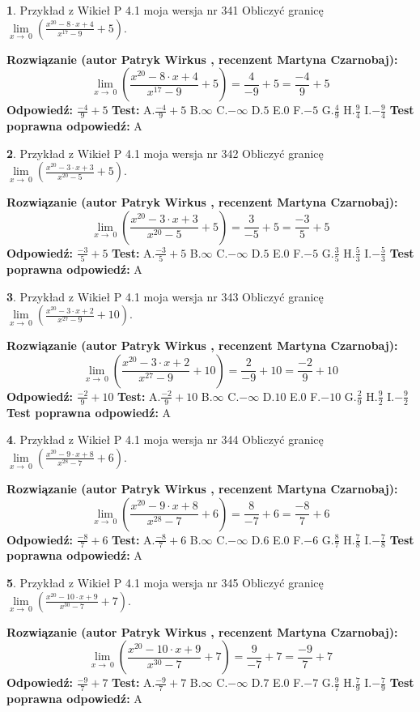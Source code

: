 \documentclass[12pt, a4paper]{article}
\theoremstyle{definition} %
\newtheorem{zad}{}
\newcommand{\zadStart}[1]{\begin{zad}#1\newline}
\newcommand{\zadStop}{\end{zad}}
\newcommand{\rozwStart}[2]{\noindent \textbf{Rozwiązanie (autor #1 , recenzent #2): }\newline}
\newcommand{\rozwStop}{\newline}
\newcommand{\odpStart}{\noindent \textbf{Odpowiedź:}\newline}
\newcommand{\odpStop}{\newline}
\newcommand{\testStart}{\noindent \textbf{Test:}\newline}
\newcommand{\testStop}{\newline}
\newcommand{\kluczStart}{\noindent \textbf{Test poprawna odpowiedź:}\newline}
\newcommand{\kluczStop}{\newline}
\begin{document}
\zadStart{Przykład z Wikieł P 4.1 moja wersja nr 341}
Obliczyć granicę $\lim\limits_{x\to\ 0}(\frac{x^{20}-8 \cdot x +4}{x^{17}-9}+5)$.
\zadStop
\rozwStart{Patryk Wirkus}{Martyna Czarnobaj}
$$\lim\limits_{x\to\ 0}(\frac{x^{20}-8 \cdot x +4}{x^{17}-9}+5)=\frac{4}{-9}+5=\frac{-4}{9}+5$$
\rozwStop
\odpStart
$\frac{-4}{9}+5$
\odpStop
\testStart
A.$\frac{-4}{9}+5$
B.$\infty$
C.$-\infty$
D.$5$
E.$0$
F.$-5$
G.$\frac{4}{9}$
H.$\frac{9}{4}$
I.$-\frac{9}{4}$
\testStop
\kluczStart
A
\kluczStop



\zadStart{Przykład z Wikieł P 4.1 moja wersja nr 342}
Obliczyć granicę $\lim\limits_{x\to\ 0}(\frac{x^{20}-3 \cdot x +3}{x^{20}-5}+5)$.
\zadStop
\rozwStart{Patryk Wirkus}{Martyna Czarnobaj}
$$\lim\limits_{x\to\ 0}(\frac{x^{20}-3 \cdot x +3}{x^{20}-5}+5)=\frac{3}{-5}+5=\frac{-3}{5}+5$$
\rozwStop
\odpStart
$\frac{-3}{5}+5$
\odpStop
\testStart
A.$\frac{-3}{5}+5$
B.$\infty$
C.$-\infty$
D.$5$
E.$0$
F.$-5$
G.$\frac{3}{5}$
H.$\frac{5}{3}$
I.$-\frac{5}{3}$
\testStop
\kluczStart
A
\kluczStop



\zadStart{Przykład z Wikieł P 4.1 moja wersja nr 343}
Obliczyć granicę $\lim\limits_{x\to\ 0}(\frac{x^{20}-3 \cdot x +2}{x^{27}-9}+10)$.
\zadStop
\rozwStart{Patryk Wirkus}{Martyna Czarnobaj}
$$\lim\limits_{x\to\ 0}(\frac{x^{20}-3 \cdot x +2}{x^{27}-9}+10)=\frac{2}{-9}+10=\frac{-2}{9}+10$$
\rozwStop
\odpStart
$\frac{-2}{9}+10$
\odpStop
\testStart
A.$\frac{-2}{9}+10$
B.$\infty$
C.$-\infty$
D.$10$
E.$0$
F.$-10$
G.$\frac{2}{9}$
H.$\frac{9}{2}$
I.$-\frac{9}{2}$
\testStop
\kluczStart
A
\kluczStop



\zadStart{Przykład z Wikieł P 4.1 moja wersja nr 344}
Obliczyć granicę $\lim\limits_{x\to\ 0}(\frac{x^{20}-9 \cdot x +8}{x^{28}-7}+6)$.
\zadStop
\rozwStart{Patryk Wirkus}{Martyna Czarnobaj}
$$\lim\limits_{x\to\ 0}(\frac{x^{20}-9 \cdot x +8}{x^{28}-7}+6)=\frac{8}{-7}+6=\frac{-8}{7}+6$$
\rozwStop
\odpStart
$\frac{-8}{7}+6$
\odpStop
\testStart
A.$\frac{-8}{7}+6$
B.$\infty$
C.$-\infty$
D.$6$
E.$0$
F.$-6$
G.$\frac{8}{7}$
H.$\frac{7}{8}$
I.$-\frac{7}{8}$
\testStop
\kluczStart
A
\kluczStop



\zadStart{Przykład z Wikieł P 4.1 moja wersja nr 345}
Obliczyć granicę $\lim\limits_{x\to\ 0}(\frac{x^{20}-10 \cdot x +9}{x^{30}-7}+7)$.
\zadStop
\rozwStart{Patryk Wirkus}{Martyna Czarnobaj}
$$\lim\limits_{x\to\ 0}(\frac{x^{20}-10 \cdot x +9}{x^{30}-7}+7)=\frac{9}{-7}+7=\frac{-9}{7}+7$$
\rozwStop
\odpStart
$\frac{-9}{7}+7$
\odpStop
\testStart
A.$\frac{-9}{7}+7$
B.$\infty$
C.$-\infty$
D.$7$
E.$0$
F.$-7$
G.$\frac{9}{7}$
H.$\frac{7}{9}$
I.$-\frac{7}{9}$
\testStop
\kluczStart
A
\kluczStop
\end{document}
